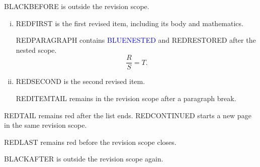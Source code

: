 \documentclass{article}
\newenvironment{REV}{\color{revisionR2}}{\ignorespacesafterend}
\begin{document}
BLACKBEFORE is outside the revision scope.

\begin{REV}
\begin{enumerate}[(i)]
\item REDFIRST is the first revised item, including its body and mathematics.

REDPARAGRAPH contains \textcolor{blue}{BLUENESTED} and REDRESTORED after the nested scope.
\begin{equation}
  \frac{R}{S}=T.
\end{equation}

\item REDSECOND is the second revised item.

REDITEMTAIL remains in the revision scope after a paragraph break.
\end{enumerate}

REDTAIL remains red after the list ends.
\newpage
REDCONTINUED starts a new page in the same revision scope.

REDLAST remains red before the revision scope closes.
\end{REV}

BLACKAFTER is outside the revision scope again.
\end{document}

